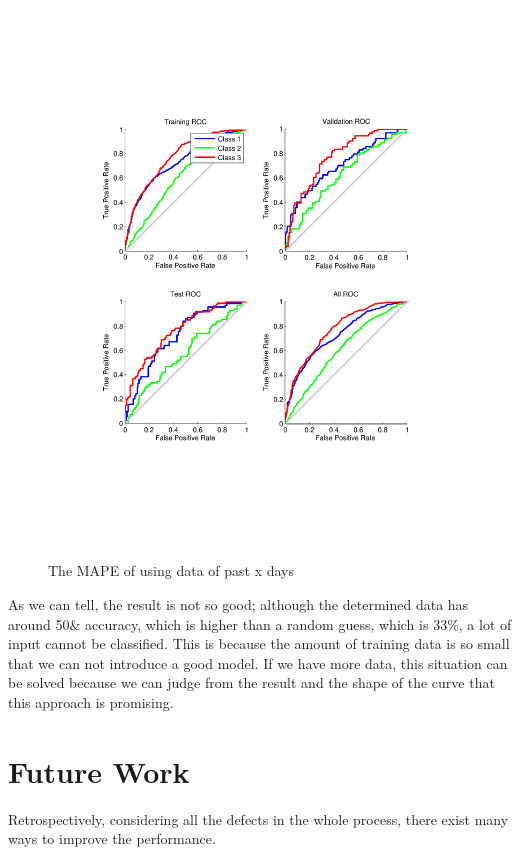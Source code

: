 \documentclass{sig-alternate}
\begin{document}
\begin{figure}[ht]
\centering
\includegraphics[scale = 0.4, trim = 300 150 300 150]{pic/cl2.pdf}
\caption{The MAPE of using data of past x days}
\end{figure}

As we can tell, the result is not so good; although the determined data has around 50\& accuracy, which is higher than a random guess, which is 33\%, a lot of input cannot be classified. This is because the amount of training data is so small that we can not introduce a good model. If we have more data, this situation can be solved because we can judge from the result and the shape of the curve that this approach is promising.

\section{Future Work}


Retrospectively, considering all the defects in the whole process, there exist many ways to improve the performance.
\end{document}
